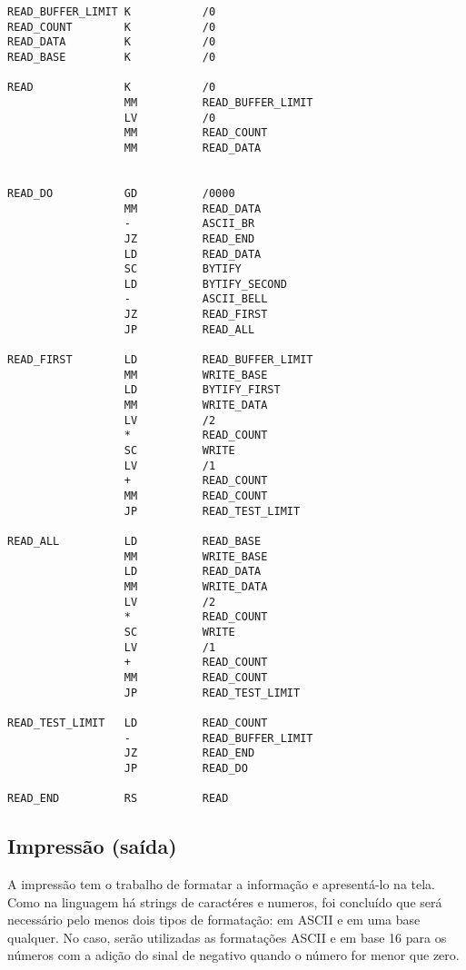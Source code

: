 \begin{lstlisting}
READ_BUFFER_LIMIT K           /0
READ_COUNT        K           /0
READ_DATA         K           /0
READ_BASE         K           /0

READ              K           /0
                  MM          READ_BUFFER_LIMIT
                  LV          /0
                  MM          READ_COUNT
                  MM          READ_DATA
                  

READ_DO           GD          /0000
                  MM          READ_DATA
                  -           ASCII_BR
                  JZ          READ_END
                  LD          READ_DATA
                  SC          BYTIFY
                  LD          BYTIFY_SECOND     
                  -           ASCII_BELL
                  JZ          READ_FIRST
                  JP          READ_ALL

READ_FIRST        LD          READ_BUFFER_LIMIT
                  MM          WRITE_BASE
                  LD          BYTIFY_FIRST
                  MM          WRITE_DATA
                  LV          /2
                  *           READ_COUNT
                  SC          WRITE
                  LV          /1
                  +           READ_COUNT
                  MM          READ_COUNT
                  JP          READ_TEST_LIMIT

READ_ALL          LD          READ_BASE
                  MM          WRITE_BASE
                  LD          READ_DATA
                  MM          WRITE_DATA
                  LV          /2
                  *           READ_COUNT
                  SC          WRITE
                  LV          /1
                  +           READ_COUNT
                  MM          READ_COUNT
                  JP          READ_TEST_LIMIT

READ_TEST_LIMIT   LD          READ_COUNT
                  -           READ_BUFFER_LIMIT
                  JZ          READ_END
                  JP          READ_DO

READ_END          RS          READ
\end{lstlisting}

\subsection{Impressão (saída)}
A impressão tem o trabalho de formatar a informação e apresentá-lo na tela. Como na linguagem há strings de caractéres e numeros, foi concluído que será necessário pelo menos dois tipos de formatação: em ASCII e em uma base qualquer. No caso, serão utilizadas as formatações ASCII e em base 16 para os números com a adição do sinal de negativo quando o número for menor que zero.

